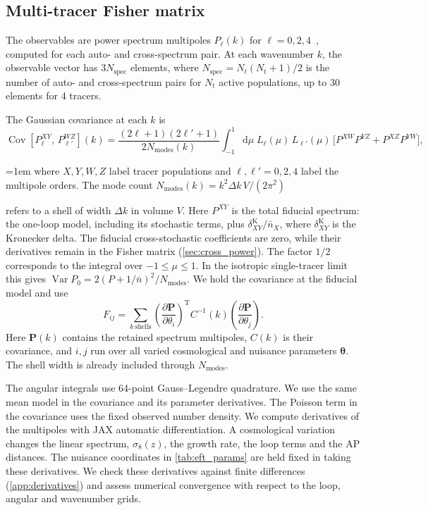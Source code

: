 \documentclass[a4paper,11pt]{article}
\newcommand{\revchange}[1]{{\color{RevisionColor}#1}}
\def\be{\begin{equation}}
\def\ee{\end{equation}}
\newcommand{\dd}{\mathrm{d}}
\DeclareMathOperator{\Cov}{Cov}
\newcommand{\nbar}{\bar{n}}
\begin{document}
\subsection{Multi-tracer Fisher matrix}
\label{sec:mt_fisher}

The observables are power spectrum multipoles
$P_\ell(k)$ for $\ell=0,2,4$~\cite{Ivanov:2019pdj,DAmico:2019fhj},
computed for each auto- and cross-spectrum pair. At each wavenumber $k$, the observable vector has $3 N_{\mathrm{spec}}$ elements, where $N_{\mathrm{spec}}=N_t(N_t{+}1)/2$ is the number of auto- and cross-spectrum pairs \revchange{for $N_t$ active populations}, up to 30 elements for 4 tracers.

The Gaussian covariance at each $k$ is
\be
\Cov\!\left[P_\ell^{XY},\, P_{\ell'}^{WZ}\right]\!(k)
= \frac{(2\ell{+}1)(2\ell'{+}1)}{2 N_{\mathrm{modes}}(k)}
  \int_{-1}^{1}\!\dd\mu\; L_\ell(\mu)\, L_{\ell'}(\mu)\,
  \bigl[P^{XW} P^{YZ}
  + P^{XZ} P^{YW}\bigr],
\ee
{\emergencystretch=1em
\revchange{where $X,Y,W,Z$ label tracer populations and $\ell,\ell'=0,2,4$
label the multipole orders. The mode count}
$N_{\mathrm{modes}}(k)=k^2\Delta k\,V/(2\pi^2)$ \revchange{refers to a shell
of width $\Delta k$ in volume $V$. Here $P^{XY}$ is the total fiducial
spectrum: the one-loop model, including its stochastic terms,
plus $\delta_{XY}^{\mathrm{K}}/\nbar_X$, where $\delta_{XY}^{\mathrm{K}}$ is the Kronecker delta.
The fiducial cross-stochastic
coefficients are zero, while their derivatives remain in the
Fisher matrix (\cref{sec:cross_power}). The factor $1/2$
corresponds to the integral over $-1\leq\mu\leq1$. In the
isotropic single-tracer limit this gives
$\operatorname{Var}P_0=2(P+1/\nbar)^2/N_{\mathrm{modes}}$.
We hold the covariance at the fiducial model and use
\[
F_{ij}=\sum_{k\ {\mathrm{shells}}}
\left(\frac{\partial\boldsymbol{P}}{\partial\theta_i}\right)^{\!\mathrm{T}}
 C^{-1}(k)
\left(\frac{\partial\boldsymbol{P}}{\partial\theta_j}\right).
\]
Here $\boldsymbol{P}(k)$ contains the retained spectrum multipoles,
$C(k)$ is their covariance, and $i,j$ run over all varied cosmological
and nuisance parameters $\boldsymbol{\theta}$.
The shell width is already included through $N_{\mathrm{modes}}$.

The angular integrals use 64-point Gauss--Legendre quadrature.
We use the same mean model in the
covariance and its parameter derivatives.
The Poisson term in the covariance
uses the fixed observed number density.
We compute derivatives of the multipoles with JAX automatic
differentiation. A cosmological variation changes the linear
spectrum, $\sigma_8(z)$, the growth rate, the loop terms and
the AP distances. The nuisance
coordinates in \cref{tab:eft_params} are held fixed in taking
these derivatives. We check these
derivatives against finite differences (\cref{app:derivatives}) and assess numerical convergence with respect to the loop, angular and wavenumber
grids.\par}}
\end{document}
